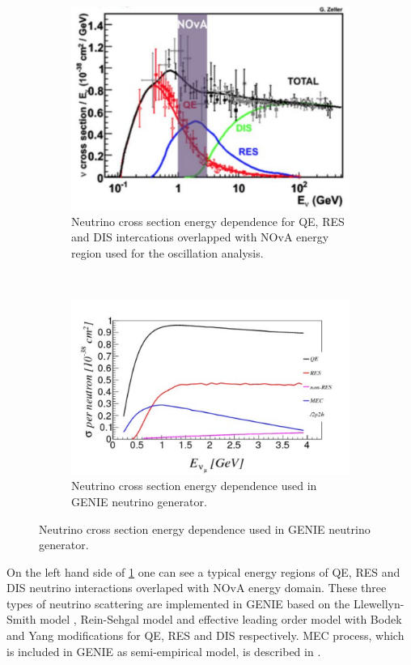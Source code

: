 \begin{figure}[t!]
\begin{subfigure}[t]{.5\textwidth}
  \centering
  \includegraphics[width=0.85\linewidth]{figures/nu_channels.pdf}
  \caption{Neutrino cross section energy dependence for QE, RES and DIS intercations overlapped with 
	NOvA energy region used for the oscillation analysis.}
  \label{fig:NovaEReg}
\end{subfigure}%
~
\begin{subfigure}[t]{.5\textwidth}
  \centering
  \includegraphics[width=1.1\linewidth]{figures/mec_xsec.pdf}
  \caption{Neutrino cross section energy dependence used in GENIE neutrino generator.}
  \label{fig:mecXsec}
\end{subfigure}
\label{fig:simPlots}
\end{figure}

On the left hand side of \ref{fig:NovaEReg} one can see a typical energy regions of QE, RES and DIS neutrino 
interactions overlaped with NOvA energy domain. These three types of neutrino scattering are implemented 
in GENIE based on the Llewellyn-Smith model \cite{QE}, Rein-Sehgal model \cite{RES} and effective leading 
order model with Bodek and Yang modifications \cite{DIS} for QE, RES and DIS respectively. MEC process, 
which is included in GENIE as semi-empirical model, is described in \cite{MEC}.

